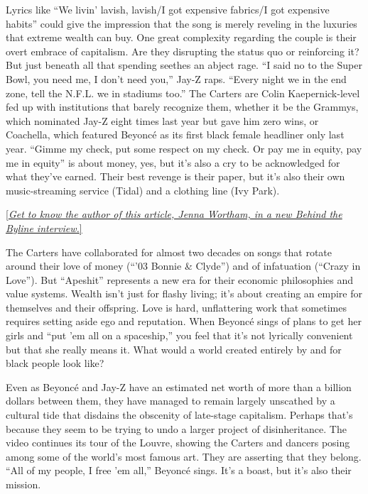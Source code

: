 Lyrics like ``We livin' lavish, lavish/I got expensive fabrics/I got
expensive habits'' could give the impression that the song is merely
reveling in the luxuries that extreme wealth can buy. One great
complexity regarding the couple is their overt embrace of capitalism.
Are they disrupting the status quo or reinforcing it? But just beneath
all that spending seethes an abject rage. ``I said no to the Super Bowl,
you need me, I don't need you,'' Jay-Z raps. ``Every night we in the end
zone, tell the N.F.L. we in stadiums too.'' The Carters are Colin
Kaepernick-level fed up with institutions that barely recognize them,
whether it be the Grammys, which nominated Jay-Z eight times last year
but gave him zero wins, or Coachella, which featured Beyoncé as its
first black female headliner only last year. ``Gimme my check, put some
respect on my check. Or pay me in equity, pay me in equity'' is about
money, yes, but it's also a cry to be acknowledged for what they've
earned. Their best revenge is their paper, but it's also their own
music-streaming service (Tidal) and a clothing line (Ivy Park).

\href{https://www.nytimes3xbfgragh.onion/2019/03/07/reader-center/jenna-wortham-new-york-times-magazine-still-processing.html}{{[}\emph{Get
to know the author of this article, Jenna Wortham, in a new Behind the
Byline interview.}{]}}

The Carters have collaborated for almost two decades on songs that
rotate around their love of money (``'03 Bonnie \& Clyde'') and of
infatuation (``Crazy in Love''). But ``Apeshit'' represents a new era
for their economic philosophies and value systems. Wealth isn't just for
flashy living; it's about creating an empire for themselves and their
offspring. Love is hard, unflattering work that sometimes requires
setting aside ego and reputation. When Beyoncé sings of plans to get her
girls and ``put 'em all on a spaceship,'' you feel that it's not
lyrically convenient but that she really means it. What would a world
created entirely by and for black people look like?

Even as Beyoncé and Jay-Z have an estimated net worth of more than a
billion dollars between them, they have managed to remain largely
unscathed by a cultural tide that disdains the obscenity of late-stage
capitalism. Perhaps that's because they seem to be trying to undo a
larger project of disinheritance. The video continues its tour of the
Louvre, showing the Carters and dancers posing among some of the world's
most famous art. They are asserting that they belong. ``All of my
people, I free 'em all,'' Beyoncé sings. It's a boast, but it's also
their mission.

